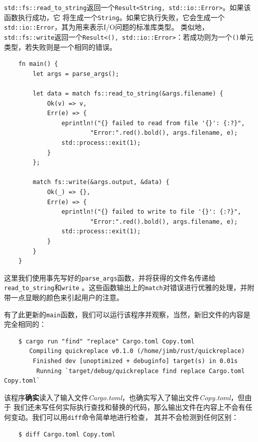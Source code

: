 \smallskip
\texttt{std::fs::read\_to\_string}返回一个\texttt{Result<String, std::io::Error>}。如果该函数执行成功，它
将生成一个\texttt{String}。如果它执行失败，它会生成一个\texttt{std::io::Error}，其为用来表示I/O问题的标准库类型。
类似地，\texttt{std::fs::write}返回一个\texttt{Result<(), std::io::Error>}：若成功则为一个\texttt{()}单元
类型，若失败则是一个相同的错误。
\begin{verbatim}
    fn main() {
        let args = parse_args();
        
        let data = match fs::read_to_string(&args.filename) {
            Ok(v) => v,
            Err(e) => {
                eprintln!("{} failed to read from file '{}': {:?}",
                        "Error:".red().bold(), args.filename, e);
                std::process::exit(1);
            }
        };

        match fs::write(&args.output, &data) {
            Ok(_) => {},
            Err(e) => {
                eprintln!("{} failed to write to file '{}': {:?}",
                        "Error:".red().bold(), args.filename, e);
                std::process::exit(1);
            }
        }
    }
\end{verbatim}

\smallskip
这里我们使用事先写好的\texttt{parse\_args}函数，并将获得的文件名传递给\texttt{read\_to\_string}和\texttt{write}
。这些函数输出上的\texttt{match}对错误进行优雅的处理，并附带一点显眼的颜色来引起用户的注意。

\medskip
有了此更新的\texttt{main}函数，我们可以运行该程序并观察，当然，新旧文件的内容是完全相同的：
\begin{verbatim}
    $ cargo run "find" "replace" Cargo.toml Copy.toml
       Compiling quickreplace v0.1.0 (/home/jimb/rust/quickreplace)
        Finished dev [unoptimized + debuginfo] target(s) in 0.01s
         Running `target/debug/quickreplace find replace Cargo.toml Copy.toml`
\end{verbatim}

\smallskip
该程序{\bfseries{确实}}读入了输入文件\textit{Cargo.toml}，也确实写入了输出文件\textit{Copy.toml}，但由于
我们还未写任何实际执行查找和替换的代码，那么输出文件在内容上不会有任何变动。我们可以用\texttt{diff}命令简单地进行检查，
其并不会检测到任何区别：
\begin{verbatim}
    $ diff Cargo.toml Copy.toml
\end{verbatim}

\smallskip
